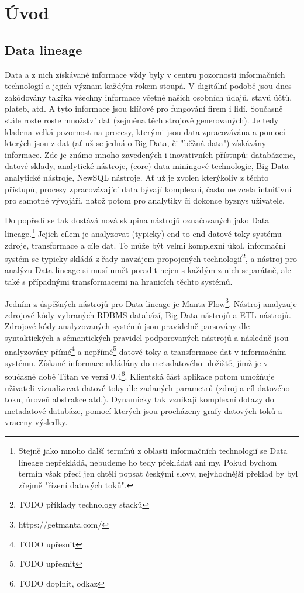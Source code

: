 \chapter{Úvod}

\section{Data lineage}

Data a z nich získávané informace vždy byly v centru pozornosti informačních technologií a jejich význam každým rokem stoupá. V digitální podobě jsou dnes zakódovány takřka všechny informace včetně našich 
osobních údajů, stavů účtů, plateb, atd. %
A tyto informace jsou klíčové pro fungování firem i lidí. %
Současně stále roste roste množství dat (zejména těch strojově generovaných). %
Je tedy kladena velká pozornost na procesy, kterými jsou data zpracovávána a pomocí kterých jsou z dat (ať už se jedná o Big Data, či "běžná data") získávány informace. Zde je známo mnoho zavedených i inovativních přístupů:   databázeme, datové sklady,  analytické nástroje, (core) data miningové technologie,  Big Data analytické nástroje, NewSQL nástroje. Ať už je zvolen kterýkoliv z těchto přístupů, procesy zpracovávající data bývají komplexní, často ne zcela intuitivní pro samotné vývojáři, natož potom pro analytiky či dokonce byznys uživatele. 

Do popředí se tak dostává nová skupina nástrojů označovaných jako Data lineage.\footnote{Stejně jako mnoho další termínů z oblasti informačních technologií se Data lineage nepřekládá, nebudeme ho tedy překládat ani my. Pokud bychom termín však přeci jen chtěli popsat českými slovy, nejvhodnější překlad by byl zřejmě "řízení datových toků".}
Jejich cílem je analyzovat (typicky) end-to-end datové toky systému - zdroje, transformace a cíle dat. To může být velmi komplexní úkol, informační systém se typicky skládá z řady navzájem propojených technologií\footnote{TODO příklady technology stacků}, a nástroj pro analýzu Data lineage si musí umět poradit nejen s každým z nich separátně, ale také s případnými transformacemi na hranicích těchto systémů. 

Jedním z úspěšných nástrojů pro Data lineage je Manta Flow\footnote{https://getmanta.com/}. Nástroj analyzuje zdrojové kódy vybraných RDBMS databází, Big Data nástrojů a ETL nástrojů. 
Zdrojové kódy analyzovaných systémů jsou pravidelně parsovány dle syntaktických a sémantických pravidel podporovaných nástrojů a následně jsou analyzovány přímé\footnote{TODO upřesnit} a nepřímé\footnote{TODO upřesnit} datové toky a transformace dat v informačním systému. Získané informace ukládány do metadatového uložiště, jímž je v současné době Titan ve verzi 0.4\footnote{TODO doplnit, odkaz}. Klientská část aplikace potom umožňuje uživateli vizualizovat datové toky dle zadaných parametrů (zdroj a cíl datového toku, úroveň abstrakce atd.). Dynamicky tak vznikají komplexní dotazy do metadatové databáze, pomocí kterých jsou procházeny grafy datových toků a vraceny výsledky.    


